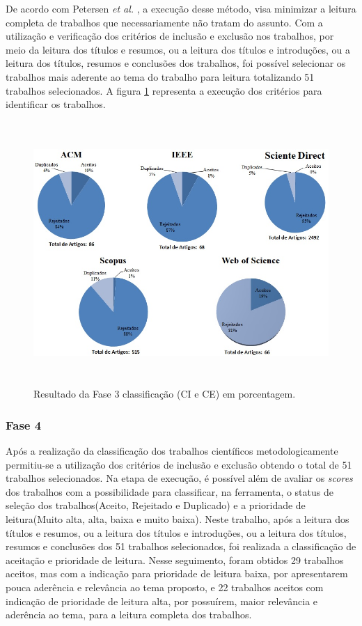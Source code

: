De acordo com Petersen \textit{et al.} \cite{petersen2008systematic}, a execução desse método, visa minimizar a leitura completa de trabalhos que necessariamente não tratam do assunto. Com a utilização e verificação dos critérios de inclusão e exclusão nos trabalhos, por meio da leitura dos títulos e resumos, ou a leitura dos títulos e introduções, ou a leitura dos títulos, resumos e conclusões dos trabalhos, foi possível selecionar os trabalhos mais aderente ao tema do trabalho para leitura totalizando 51 trabalhos selecionados. A figura \ref{fig:fase3Criterios} representa a execução dos critérios para identificar os trabalhos.

\begin{figure}[H]
\centering
\includegraphics[width = 13cm, height=10cm]{img/Classificacao_FASE_3_CI_e_CE.jpg}
\caption{Resultado da Fase 3 classificação (CI e CE) em porcentagem.}
\label{fig:fase3Criterios}
\end{figure}

\subsubsection{Fase 4} Após a realização da classificação dos trabalhos científicos metodologicamente permitiu-se a utilização dos critérios de inclusão e exclusão obtendo o total de 51 trabalhos selecionados. Na etapa de execução, é possível além de avaliar os \textit{scores} dos trabalhos com a possibilidade para classificar, na ferramenta, o status de seleção dos trabalhos(Aceito, Rejeitado e Duplicado) e a prioridade de leitura(Muito alta, alta, baixa e muito baixa). Neste trabalho, após a leitura dos títulos e resumos, ou a leitura dos títulos e introduções, ou a leitura dos títulos, resumos e conclusões dos 51 trabalhos selecionados, foi realizada a classificação de aceitação e prioridade de leitura. Nesse seguimento, foram obtidos 29 trabalhos aceitos, mas com a indicação para prioridade de leitura baixa, por apresentarem pouca aderência e relevância ao tema proposto, e 22 trabalhos aceitos com indicação de prioridade de leitura alta, por possuírem, maior relevância e aderência ao tema, para a leitura completa dos trabalhos.   

